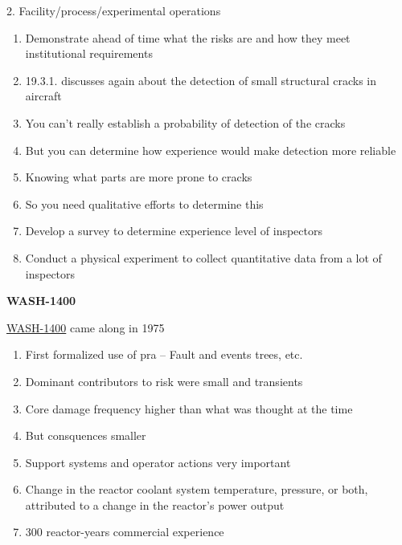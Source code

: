 \documentclass[aspectratio=1610,pdftex,dvipsnames,compress,xcolor={dvipsnames}]{beamer}
\newcommand{\acs}{\acrshort} %
\newcommand{\acsp}{\acrshortpl} %
\begin{document}
\begin{frame}{2. Facility/process/experimental operations}
    \begin{enumerate}[series=outerlist,topsep=0pt,itemsep=11pt,leftmargin=*,label=(\arabic*)]
        \item[]Demonstrate ahead of time what the risks are and how they meet institutional requirements
        \item[]19.3.1. discusses again about the detection of small structural cracks in aircraft
        \item[]You can't really establish a probability of detection of the cracks
        \item[]But you can determine how experience would make detection more reliable
        \item[]Knowing what parts are more prone to cracks
        \item[]So you need qualitative efforts to determine this
        \item[]Develop a survey to determine experience level of inspectors
        \item[]Conduct a physical experiment to collect quantitative data from a lot of inspectors
    \end{enumerate}
\end{frame}


\begin{frame}[plain]{}
    \centering\LARGE\textbf{WASH-1400}
\end{frame}


\addtocounter{framenumber}{-1}
\begin{frame}{\href{https://uidaho.pressbooks.pub/riskassessment/chapter/pra-2/}{WASH-1400} came along in 1975}
    \begin{enumerate}[series=outerlist,topsep=0pt,itemsep=11pt,leftmargin=*,label=(\arabic*)]
        \item[]First formalized use of \acs{pra} -- Fault and events trees, etc.
        \item[]Dominant contributors to risk were small \acsp{loc} and transients
        \item[]Core damage frequency higher than what was thought at the time  
        \item[]But consquences smaller
        \item[]Support systems and operator actions very important
        \item[]Change in the reactor coolant system temperature, pressure, or both, attributed to a change in the reactor's power output
        \item[]300 reactor-years commercial experience
    \end{enumerate}
\end{frame}
\end{document}
